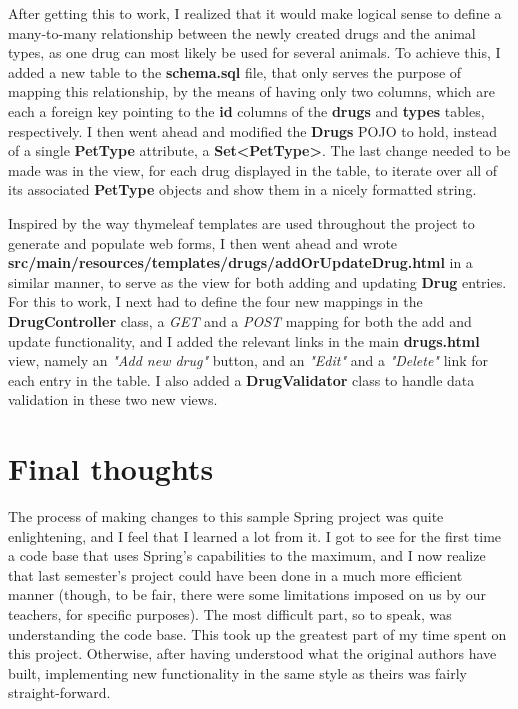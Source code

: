 \documentclass[12pt, a4paper]{article}
\begin{document}
After getting this to work, I realized that it would make logical sense to define a many-to-many relationship between the newly created drugs and the animal types, as one drug can most likely be used for several animals. To achieve this, I added a new table to the \textbf{schema.sql} file, that only serves the purpose of mapping this relationship, by the means of having only two columns, which are each a foreign key pointing to the \textbf{id} columns of the \textbf{drugs} and \textbf{types} tables, respectively. I then went ahead and modified the \textbf{Drugs} POJO to hold, instead of a single \textbf{PetType} attribute, a \textbf{Set\textless PetType\textgreater}. The last change needed to be made was in the view, for each drug displayed in the table, to iterate over all of its associated \textbf{PetType} objects and show them in a nicely formatted string.

Inspired by the way thymeleaf templates are used throughout the project to generate and populate web forms, I then went ahead and wrote \textbf{src/main/resources/templates/drugs/addOrUpdateDrug.html} in a similar manner, to serve as the view for both adding and updating \textbf{Drug} entries. For this to work, I next had to define the four new mappings in the \textbf{DrugController} class, a \textit{GET} and a \textit{POST} mapping for both the add and update functionality, and I added the relevant links in the main \textbf{drugs.html} view, namely an \textit{"Add new drug"} button, and an \textit{"Edit"} and a \textit{"Delete"} link for each entry in the table. I also added a \textbf{DrugValidator} class to handle data validation in these two new views.

\newpage
\section{Final thoughts}

The process of making changes to this sample Spring project was quite enlightening, and I feel that I learned a lot from it. I got to see for the first time a code base that uses Spring's capabilities to the maximum, and I now realize that last semester's project could have been done in a much more efficient manner (though, to be fair, there were some limitations imposed on us by our teachers, for specific purposes). The most difficult part, so to speak, was understanding the code base. This took up the greatest part of my time spent on this project. Otherwise, after having understood what the original authors have built, implementing new functionality in the same style as theirs was fairly straight-forward.
\end{document}
